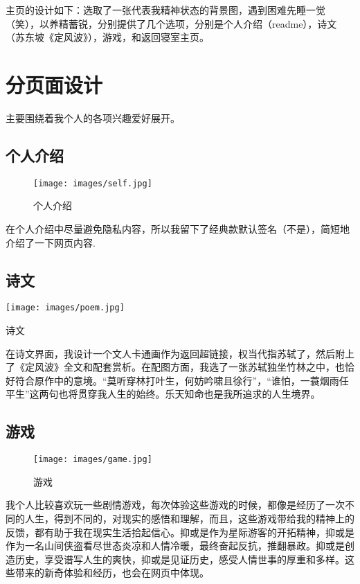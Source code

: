 \documentclass[supercite]{Experimental_Report}
\theoremstyle{definition}
\begin{document}
主页的设计如下：选取了一张代表我精神状态的背景图，遇到困难先睡一觉（笑），以养精蓄锐，分别提供了几个选项，分别是个人介绍（readme），诗文（苏东坡《定风波》），游戏，和返回寝室主页。

\newpage

\section{分页面设计}

主要围绕着我个人的各项兴趣爱好展开。

\subsection{个人介绍}

\begin{figure}[h]
	\begin{center}
		\texttt{[image: images/self.jpg]}
		\caption{个人介绍}
		\label{fig3-1}
	\end{center}
\end{figure}
在个人介绍中尽量避免隐私内容，所以我留下了经典款默认签名（不是），简短地介绍了一下网页内容.

\subsection{诗文}

		\texttt{[image: images/poem.jpg]}
		\caption{诗文}
		\label{fig3-2}

在诗文界面，我设计一个文人卡通画作为返回超链接，权当代指苏轼了，然后附上了《定风波》全文和配套赏析。在配图方面，我选了一张苏轼独坐竹林之中，也恰好符合原作中的意境。“莫听穿林打叶生，何妨吟啸且徐行”，“谁怕，一蓑烟雨任平生”这两句也将贯穿我人生的始终。乐天知命也是我所追求的人生境界。

\subsection{游戏}

\begin{figure}[h]
	\begin{center}
		\texttt{[image: images/game.jpg]}
		\caption{游戏}
		\label{fig3-3}
	\end{center}
\end{figure}

我个人比较喜欢玩一些剧情游戏，每次体验这些游戏的时候，都像是经历了一次不同的人生，得到不同的，对现实的感悟和理解，而且，这些游戏带给我的精神上的反馈，都有助于我在现实生活拾起信心。抑或是作为星际游客的开拓精神，抑或是作为一名山间侠盗看尽世态炎凉和人情冷暖，最终奋起反抗，推翻暴政。抑或是创造历史，享受谱写人生的爽快，抑或是见证历史，感受人情世事的厚重和多样。这些带来的新奇体验和经历，也会在网页中体现。
\end{document}
